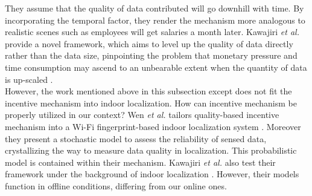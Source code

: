 \documentclass[10pt,conference,compsocconf,letterpaper]{IEEEtran}
\begin{document}
They assume that the quality of data contributed will go downhill with time. %
By incorporating the temporal factor, they render the mechanism more analogous to realistic scenes such as employees will get salaries a month later.
Kawajiri \emph{et al.} provide a novel framework, %
which aims to level up the quality of data directly rather than the data size, pinpointing the problem that monetary pressure and time consumption may ascend to an unbearable extent when the quantity of data is up-scaled \cite{kawajiri2014steered}.\\ %
\indent However, the work mentioned above in this subsection except \cite{kawajiri2014steered} does not fit the incentive mechanism into indoor localization. %
How can incentive mechanism be properly utilized in our context? Wen \emph{et al.} tailors quality-based incentive mechanism into a Wi-Fi fingerprint-based indoor localization system \cite{lbs2}. %
Moreover they present a stochastic model to assess the reliability of sensed data, crystallizing the way to measure data quality in localization. %
This probabilistic model is contained within their mechanism. Kawajiri \emph{et al.} also test their framework under the background of indoor localization \cite{kawajiri2014steered}. However, their models function in offline conditions, differing from our online ones. %
\end{document}
